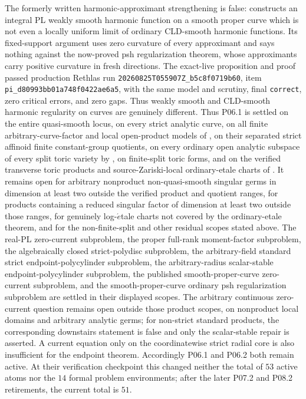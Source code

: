 The formerly written harmonic-approximant strengthening is false:
 constructs an integral
PL weakly smooth harmonic function on a smooth proper curve which is not even
a locally uniform limit of ordinary CLD-smooth harmonic functions.  Its
fixed-support argument uses zero curvature of every approximant and says
nothing against the now-proved psh regularization theorem, whose approximants
carry positive curvature in fresh directions.
The exact-live proposition and proof passed production Rethlas run
\nolinkurl{20260825T055907Z_b5c8f0719b60}, item
\nolinkurl{pi_d80993bb01a748f0422ae6a5}, with the same model and scrutiny,
final \texttt{correct}, zero critical errors, and zero gaps.  Thus weakly
smooth and CLD-smooth harmonic regularity on curves are genuinely different.
Thus P06.1 is settled on the entire quasi-smooth locus, on every strict
analytic curve, on all finite arbitrary-curve-factor and local open-product
models of , on their separated
strict affinoid finite constant-group quotients, on every ordinary open
analytic subspace of every split toric variety by
, on finite-split toric forms, and on
the verified transverse toric products and source-Zariski-local
ordinary-etale charts of
.  It remains open for
arbitrary nonproduct non-quasi-smooth singular germs in dimension at least
two outside the verified product and quotient ranges, for products containing
a reduced singular factor of dimension at least two outside those ranges,
for genuinely log-\(\acute{e}\)tale charts not covered by the ordinary-etale
theorem, and for the non-finite-split and other residual scopes stated above.
The real-PL zero-current subproblem, the proper
full-rank moment-factor subproblem, the algebraically closed strict-polydisc
subproblem, the arbitrary-field standard strict endpoint-polycylinder
subproblem,
the arbitrary-radius scalar-stable endpoint-polycylinder subproblem,
the published smooth-proper-curve zero-current subproblem, and the
smooth-proper-curve ordinary psh
regularization subproblem are settled in their displayed scopes.  The
arbitrary continuous zero-current question remains open outside those
product scopes, on nonproduct local domains and arbitrary analytic germs;
for non-strict standard products, the corresponding downstairs statement is
false and only the scalar-stable repair is asserted.  A current equation only
on the coordinatewise strict radial core is also insufficient for the
endpoint theorem.
Accordingly P06.1 and P06.2 both remain active.  At their verification
checkpoint this changed neither the total of \(53\) active atoms nor the
\(14\) formal problem environments; after the later P07.2 and P08.2
retirements, the current total is \(51\).

